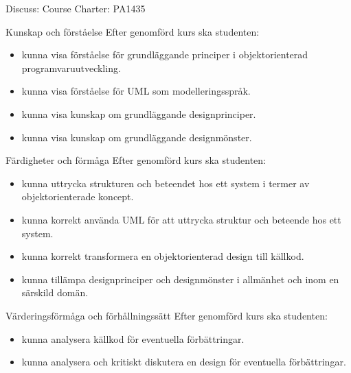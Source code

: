 \documentclass[10pt,t,a4paper]{beamer}
\begin{document}
\begin{frame}[shrink=15,label=sec-3]{Discuss: Course Charter: PA1435}

\alert{Kunskap och förståelse} Efter genomförd kurs ska studenten:
\begin{itemize}
\item kunna visa förståelse för grundläggande principer i objektorienterad programvaruutveckling.
\item kunna visa förståelse för UML som modelleringsspråk.
\item kunna visa kunskap om grundläggande designprinciper.
\item kunna visa kunskap om grundläggande designmönster.
\end{itemize}

\alert{Färdigheter och förmåga} Efter genomförd kurs ska studenten:
\begin{itemize}
\item kunna uttrycka strukturen och beteendet hos ett system i termer av objektorienterade koncept.
\item kunna korrekt använda UML för att uttrycka struktur och beteende hos ett system.
\item kunna korrekt transformera en objektorienterad design till källkod.
\item kunna tillämpa designprinciper och designmönster i allmänhet och inom en särskild domän.
\end{itemize}

\alert{Värderingsförmåga och förhållningssätt} Efter genomförd kurs ska studenten:
\begin{itemize}
\item kunna analysera källkod för eventuella förbättringar.
\item kunna analysera och kritiskt diskutera en design för eventuella förbättringar.
\end{itemize}
\end{frame}
\end{document}
